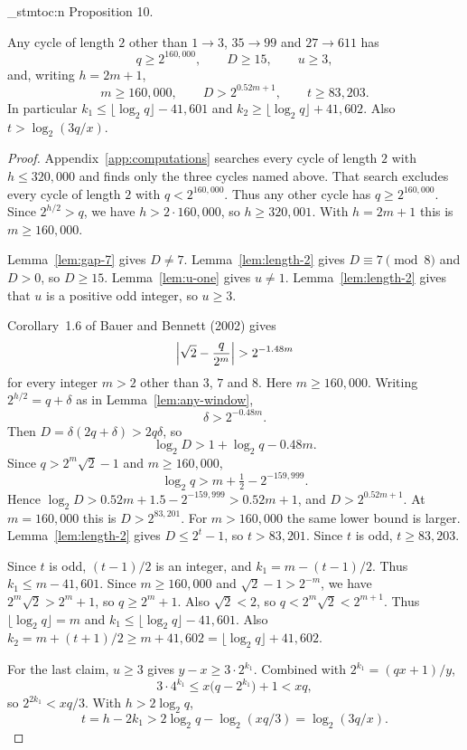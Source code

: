 \documentclass[11pt]{article}
\newenvironment{named}[1]{%
  \par\addvspace{\medskipamount}%
  \pagebreak[3]%
  \noindent{\bfseries #1}\space\ignorespaces
  \stmtoc{#1}%
}{\par\addvspace{\medskipamount}}
\newcommand{\stmtoc}[1]{ \qn_stmtoc:n {#1} }
\newcounter{lemmaref}
\newcommand{\marklemma}[2]{%
  \setcounter{lemmaref}{#1}%
  \addtocounter{lemmaref}{-1}%
  \refstepcounter{lemmaref}%
  \label{#2}%
}
\begin{document}
\begin{named}{Proposition 10.}
\marklemma{10}{prop:other-two}
Any cycle of length $2$ other than $1 \to 3$, $35 \to 99$ and $27 \to 611$ has
\[
q \ge 2^{160{,}000}, \qquad D \ge 15, \qquad u \ge 3,
\]
and, writing $h = 2m + 1$,
\[
m \ge 160{,}000, \qquad D > 2^{0.52 m + 1}, \qquad t \ge 83{,}203.
\]
In particular $k_1 \le \lfloor \log_2 q \rfloor - 41{,}601$ and $k_2 \ge \lfloor \log_2 q \rfloor + 41{,}602$.
Also $t > \log_2(3q/x)$.
\end{named}

\begin{proof}
Appendix~\ref{app:computations} searches every cycle of length $2$ with $h \le 320{,}000$ and finds only the three cycles named above.
That search excludes every cycle of length $2$ with $q < 2^{160{,}000}$.
Thus any other cycle has $q \ge 2^{160{,}000}$.
Since $2^{h/2} > q$, we have $h > 2 \cdot 160{,}000$, so $h \ge 320{,}001$.
With $h = 2m + 1$ this is $m \ge 160{,}000$.

Lemma~\ref{lem:gap-7} gives $D \ne 7$.
Lemma~\ref{lem:length-2} gives $D \equiv 7 \pmod{8}$ and $D > 0$, so $D \ge 15$.
Lemma~\ref{lem:u-one} gives $u \ne 1$.
Lemma~\ref{lem:length-2} gives that $u$ is a positive odd integer, so $u \ge 3$.

Corollary~1.6 of Bauer and Bennett (2002) gives
\[
\Bigl| \sqrt{2} - \frac{q}{2^m} \Bigr| > 2^{-1.48 m}
\]
for every integer $m > 2$ other than $3$, $7$ and $8$.
Here $m \ge 160{,}000$.
Writing $2^{h/2} = q + \delta$ as in Lemma~\ref{lem:any-window},
\[
\delta > 2^{-0.48 m}.
\]
Then $D = \delta(2q + \delta) > 2q\delta$, so
\[
\log_2 D > 1 + \log_2 q - 0.48 m.
\]
Since $q > 2^m \sqrt{2} - 1$ and $m \ge 160{,}000$,
\[
\log_2 q > m + \tfrac12 - 2^{-159{,}999}.
\]
Hence $\log_2 D > 0.52 m + 1.5 - 2^{-159{,}999} > 0.52 m + 1$, and $D > 2^{0.52 m + 1}$.
At $m = 160{,}000$ this is $D > 2^{83{,}201}$.
For $m > 160{,}000$ the same lower bound is larger.
Lemma~\ref{lem:length-2} gives $D \le 2^t - 1$, so $t > 83{,}201$.
Since $t$ is odd, $t \ge 83{,}203$.

Since $t$ is odd, $(t - 1)/2$ is an integer, and $k_1 = m - (t - 1)/2$.
Thus $k_1 \le m - 41{,}601$.
Since $m \ge 160{,}000$ and $\sqrt{2} - 1 > 2^{-m}$, we have $2^m \sqrt{2} > 2^m + 1$, so $q \ge 2^m + 1$.
Also $\sqrt{2} < 2$, so $q < 2^m \sqrt{2} < 2^{m + 1}$.
Thus $\lfloor \log_2 q \rfloor = m$ and $k_1 \le \lfloor \log_2 q \rfloor - 41{,}601$.
Also $k_2 = m + (t + 1)/2 \ge m + 41{,}602 = \lfloor \log_2 q \rfloor + 41{,}602$.

For the last claim, $u \ge 3$ gives $y - x \ge 3 \cdot 2^{k_1}$.
Combined with $2^{k_1} = (qx + 1)/y$,
\[
3 \cdot 4^{k_1} \le x\bigl(q - 2^{k_1}\bigr) + 1 < xq,
\]
so $2^{2k_1} < xq/3$.
With $h > 2\log_2 q$,
\[
t = h - 2k_1 > 2\log_2 q - \log_2(xq/3) = \log_2(3q/x).
\]
\end{proof}
\end{document}
